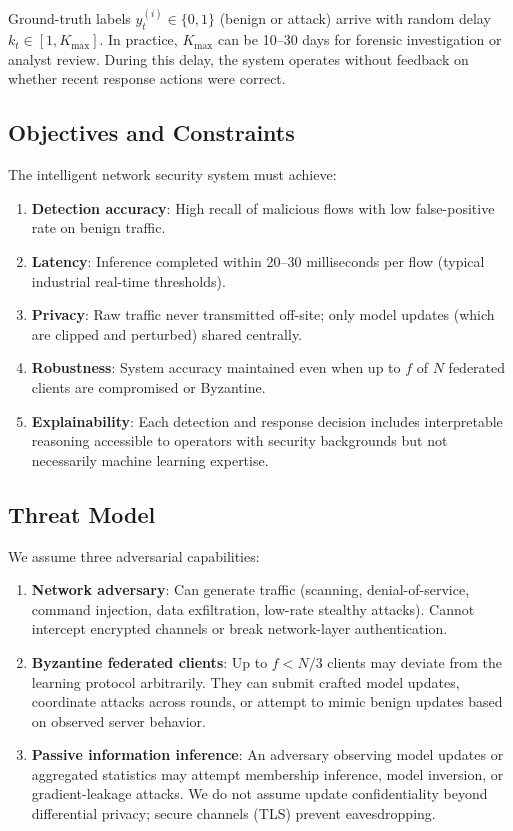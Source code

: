 \documentclass[preprint,12pt]{elsarticle}
\begin{document}
Ground-truth labels $y_t^{(i)} \in \{0, 1\}$ (benign or attack) arrive with random delay $k_t \in [1, K_{\max}]$. In practice, $K_{\max}$ can be 10--30 days for forensic investigation or analyst review. During this delay, the system operates without feedback on whether recent response actions were correct.

\subsection{Objectives and Constraints}

The intelligent network security system must achieve:

\begin{enumerate}[label=(\roman*),leftmargin=1.3em]
    \item \textbf{Detection accuracy}: High recall of malicious flows with low false-positive rate on benign traffic.
    \item \textbf{Latency}: Inference completed within 20--30 milliseconds per flow (typical industrial real-time thresholds).
    \item \textbf{Privacy}: Raw traffic never transmitted off-site; only model updates (which are clipped and perturbed) shared centrally.
    \item \textbf{Robustness}: System accuracy maintained even when up to $f$ of $N$ federated clients are compromised or Byzantine.
    \item \textbf{Explainability}: Each detection and response decision includes interpretable reasoning accessible to operators with security backgrounds but not necessarily machine learning expertise.
\end{enumerate}

\subsection{Threat Model}

We assume three adversarial capabilities:

\begin{enumerate}[label=(\alph*),leftmargin=1.3em]
    \item \textbf{Network adversary}: Can generate traffic (scanning, denial-of-service, command injection, data exfiltration, low-rate stealthy attacks). Cannot intercept encrypted channels or break network-layer authentication.
    
    \item \textbf{Byzantine federated clients}: Up to $f < N/3$ clients may deviate from the learning protocol arbitrarily. They can submit crafted model updates, coordinate attacks across rounds, or attempt to mimic benign updates based on observed server behavior.
    
    \item \textbf{Passive information inference}: An adversary observing model updates or aggregated statistics may attempt membership inference, model inversion, or gradient-leakage attacks. We do not assume update confidentiality beyond differential privacy; secure channels (TLS) prevent eavesdropping.
\end{enumerate}
\end{document}

